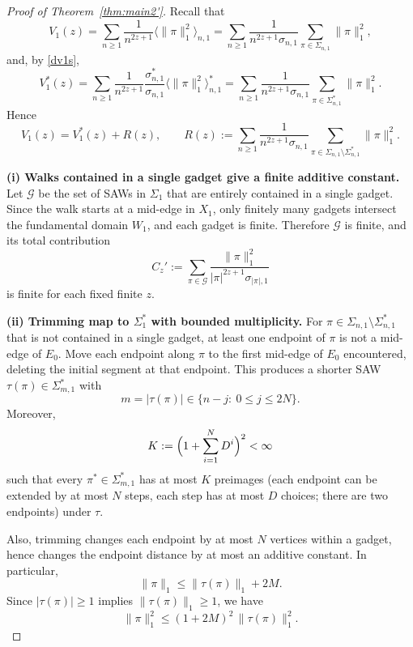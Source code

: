 \documentclass[10pt,a4paper]{amsart}
\begin{document}
\begin{proof}[Proof of Theorem~\ref{thm:main2'}]
Recall that
\[
V_1(z)=\sum_{n\ge1}\frac{1}{n^{2z+1}}\Big\langle \|\pi\|_1^2\Big\rangle_{n,1}
=\sum_{n\ge1}\frac{1}{n^{2z+1}\sigma_{n,1}}\sum_{\pi\in\Sigma_{n,1}}\|\pi\|_1^2,
\]
and, by \eqref{dv1s},
\[
V_1^\ast(z)=\sum_{n\ge1}\frac{1}{n^{2z+1}}\frac{\sigma_{n,1}^\ast}{\sigma_{n,1}}
\Big\langle \|\pi\|_1^2\Big\rangle_{n,1}^\ast
=\sum_{n\ge1}\frac{1}{n^{2z+1}\sigma_{n,1}}\sum_{\pi\in\Sigma_{n,1}^\ast}\|\pi\|_1^2.
\]
Hence
\begin{equation}\label{eq:V1-decomp}
V_1(z)=V_1^\ast(z)+R(z),
\qquad
R(z):=\sum_{n\ge1}\frac{1}{n^{2z+1}\sigma_{n,1}}
\sum_{\pi\in\Sigma_{n,1}\setminus\Sigma_{n,1}^\ast}\|\pi\|_1^2.
\end{equation}

\smallskip\noindent
\textbf{(i) Walks contained in a single gadget give a finite additive constant.}
Let $\mathcal{G}$ be the set of SAWs in $\Sigma_{1}$ that are entirely contained in a single
gadget. Since the walk starts at a mid-edge in $X_1$, only finitely many gadgets intersect
the fundamental domain $W_1$, and each gadget is finite. Therefore $\mathcal{G}$ is finite,
and its total contribution
\[
C_z' := \sum_{\pi\in\mathcal{G}}
\frac{\|\pi\|_1^2}{|\pi|^{2z+1}\sigma_{|\pi|,1}}
\]
is finite for each fixed finite $z$.

\smallskip\noindent
\textbf{(ii) Trimming map to $\Sigma_{1}^\ast$ with bounded multiplicity.}
 For $\pi\in\Sigma_{n,1}\setminus\Sigma_{n,1}^\ast$ that is not
contained in a single gadget, at least one endpoint of $\pi$ is not a mid-edge of $E_0$.
Move each endpoint along $\pi$ to the first mid-edge of $E_0$ encountered, deleting the
initial segment at that endpoint. This produces a shorter SAW $\tau(\pi)\in\Sigma_{m,1}^\ast$
with
\[
m=|\tau(\pi)|\in\{n-j:\ 0\le j\le 2N\}.
\]
Moreover, %
\[
K:=\Bigl(1+\sum_{i=1}^{N}D^{i}\Bigr)^2<\infty
\]
such that every $\pi^\ast\in\Sigma_{m,1}^\ast$ has at most $K$ preimages (each endpoint can be
extended by at most $N$ steps, each step has at most $D$ choices; there are two endpoints) under $\tau$.

Also, trimming changes each endpoint by at most $N$ vertices within a gadget, hence changes
the endpoint distance by at most an additive constant. In particular,
\[
\|\pi\|_1 \le \|\tau(\pi)\|_1 + 2M.
\]
Since $|\tau(\pi)|\ge 1$ implies $\|\tau(\pi)\|_1\ge 1$, we have
\begin{equation}\label{eq:dist-bound}
\|\pi\|_1^2 \le (1+2M)^2\,\|\tau(\pi)\|_1^2 .
\end{equation}


\end{proof}
\end{document}
